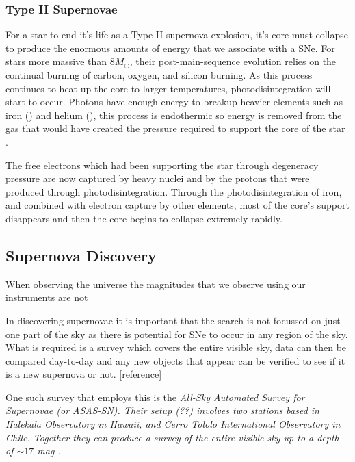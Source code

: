 \documentclass[twocolumn]{revtex4}
\begin{document}
\subsubsection{Type II Supernovae}
\vspace{-2ex}
For a star to end it's life as a Type II supernova explosion, it's core must collapse to produce the enormous amounts of energy that we associate with a SNe. For stars more massive than $8 M_{\odot}$, their post-main-sequence evolution relies on the continual burning of carbon, oxygen, and silicon burning. As this process continues to heat up the core to larger temperatures, photodisintegration will start to occur. Photons have enough energy to breakup heavier elements such as iron () and helium (), this process is endothermic so energy is removed from the gas that would have created the pressure required to support the core of the star \cite{mod_ast}. 

The free electrons which had been supporting the star through degeneracy pressure are now captured by heavy nuclei and by the protons that were produced through photodisintegration. Through the photodisintegration of iron, and combined with electron capture by other elements, most of the core's support disappears and then the core begins to collapse extremely rapidly. 

\vspace{-3ex}
\subsection{Supernova Discovery}
\vspace{-2ex}

When observing the universe the magnitudes that we observe using our instruments are not 

In discovering supernovae it is important that the search is not focussed on just one part of the sky as there is potential for SNe to occur in any region of the sky. What is required is a survey which covers the entire visible sky, data can then be compared day-to-day and any new objects that appear can be verified to see if it is a new supernova or not. [reference] 

One such survey that employs this is the \em{All-Sky Automated Survey for Supernovae }\em (or ASAS-SN). Their setup (??) involves two stations based in Halekala Observatory in Hawaii, and Cerro Tololo International Observatory in Chile. Together they can produce a survey of the entire visible sky up to a depth of $\sim 17$ mag \cite{asn_lc}.
\end{document}
